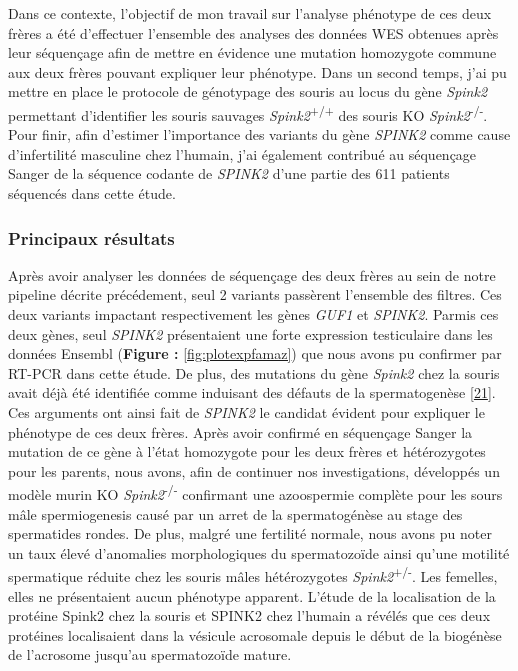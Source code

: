 \documentclass[12pt,twoside]{reedthesis}
\theoremstyle{definition}
\theoremstyle{definition}
\theoremstyle{remark}
\begin{document}
  Dans ce contexte, l'objectif de mon travail sur l'analyse phénotype de
  ces deux frères a été d'effectuer l'ensemble des analyses des données
  WES obtenues après leur séquençage afin de mettre en évidence une
  mutation homozygote commune aux deux frères pouvant expliquer leur
  phénotype. Dans un second temps, j'ai pu mettre en place le protocole de
  génotypage des souris au locus du gène \emph{Spink2} permettant
  d'identifier les souris sauvages \emph{Spink2}\textsuperscript{+/+} des
  souris KO \emph{Spink2}\textsuperscript{-/-}. Pour finir, afin d'estimer
  l'importance des variants du gène \emph{SPINK2} comme cause
  d'infertilité masculine chez l'humain, j'ai également contribué au
  séquençage Sanger de la séquence codante de \emph{SPINK2} d'une partie
  des 611 patients séquencés dans cette étude.
  
  \newpage
  
  
  
  \newpage
  
  \subsubsection{Principaux résultats}\label{principaux-resultats}
  
  Après avoir analyser les données de séquençage des deux frères au sein
  de notre pipeline décrite précédement, seul 2 variants passèrent
  l'ensemble des filtres. Ces deux variants impactant respectivement les
  gènes \emph{GUF1} et \emph{SPINK2}. Parmis ces deux gènes, seul
  \emph{SPINK2} présentaient une forte expression testiculaire dans les
  données Ensembl (\textbf{Figure : }\ref{fig:plotexpfamaz}) que nous
  avons pu confirmer par RT-PCR dans cette étude. De plus, des mutations
  du gène \emph{Spink2} chez la souris avait déjà été identifiée comme
  induisant des défauts de la spermatogenèse
  {[}\protect\hyperlink{ref-Lee2011}{21}{]}. Ces arguments ont ainsi fait
  de \emph{SPINK2} le candidat évident pour expliquer le phénotype de ces
  deux frères. Après avoir confirmé en séquençage Sanger la mutation de ce
  gène à l'état homozygote pour les deux frères et hétérozygotes pour les
  parents, nous avons, afin de continuer nos investigations, développés un
  modèle murin KO \emph{Spink2}\textsuperscript{-/-} confirmant une
  azoospermie complète pour les sours mâle spermiogenesis causé par un
  arret de la spermatogénèse au stage des spermatides rondes. De plus,
  malgré une fertilité normale, nous avons pu noter un taux élevé
  d'anomalies morphologiques du spermatozoïde ainsi qu'une motilité
  spermatique réduite chez les souris mâles hétérozygotes
  \emph{Spink2}\textsuperscript{+/-}. Les femelles, elles ne présentaient
  aucun phénotype apparent. L'étude de la localisation de la protéine
  Spink2 chez la souris et SPINK2 chez l'humain a révélés que ces deux
  protéines localisaient dans la vésicule acrosomale depuis le début de la
  biogénèse de l'acrosome jusqu'au spermatozoïde mature.
  
\end{document}
